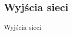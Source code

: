 \documentclass[xcolor=x11names,compress]{beamer}
\renewcommand{\(}{\begin{columns}}
\renewcommand{\)}{\end{columns}}
\newcommand{\<}[1]{\begin{column}{#1}}
\renewcommand{\>}{\end{column}}
\begin{document}
%
%
%
%
%
%
%
%
%
%
%

\subsection{Wyjścia sieci}
\begin{frame}{Wyjścia sieci}
\end{frame}
\end{document}
